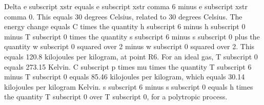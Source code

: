 Delta e subscript xstr equals e subscript xstr comma 6 minus e subscript xstr comma 0. This equals 30 degrees Celsius, related to 30 degrees Celsius. The energy change equals C times the quantity h subscript 6 minus h subscript 0 minus T subscript 0 times the quantity s subscript 6 minus s subscript 0 plus the quantity w subscript 0 squared over 2 minus w subscript 0 squared over 2. This equals 120.8 kilojoules per kilogram, at point R6. For an ideal gas, T subscript 0 equals 273.15 Kelvin. C subscript p times mu times the quantity T subscript 6 minus T subscript 0 equals 85.46 kilojoules per kilogram, which equals 30.14 kilojoules per kilogram Kelvin. s subscript 6 minus s subscript 0 equals h times the quantity T subscript 0 over T subscript 0, for a polytropic process.